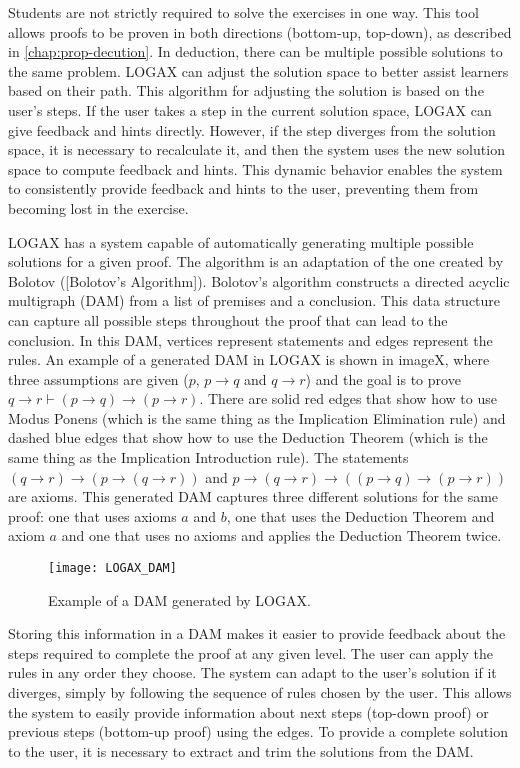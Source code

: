 Students are not strictly required to solve the exercises in one way. This tool allows proofs to be proven in both directions (bottom-up, top-down), as described in \ref{chap:prop-decution}. In deduction, there can be multiple possible solutions to the same problem. LOGAX can adjust the solution space to better assist learners based on their path. This algorithm for adjusting the solution is based on the user's steps. If the user takes a step in the current solution space, LOGAX can give feedback and hints directly. However, if the step diverges from the solution space, it is necessary to recalculate it, and then the system uses the new solution space to compute feedback and hints. This dynamic behavior enables the system to consistently provide feedback and hints to the user, preventing them from becoming lost in the exercise.

LOGAX has a system capable of automatically generating multiple possible solutions for a given proof. The algorithm is an adaptation of the one created by Bolotov ([Bolotov's Algorithm]). Bolotov's algorithm constructs a directed acyclic multigraph (\gls{DAM}) from a list of premises and a conclusion. This data structure can capture all possible steps throughout the proof that can lead to the conclusion. In this \gls{DAM}, vertices represent statements and edges represent the rules. An example of a generated \gls{DAM} in LOGAX is shown in imageX, where three assumptions are given (\(p\), \(p \to q\) and \(q \to r\)) and the goal is to prove \( q \to r \vdash (p \to q) \to (p \to r) \). There are solid red edges that show how to use Modus Ponens (which is the same thing as the Implication Elimination rule) and dashed blue edges that show how to use the Deduction Theorem (which is the same thing as the Implication Introduction rule). The statements \((q \to r) \to (p \to (q \to r)) \) and \( p \to (q \to r) \to ((p \to q) \to (p \to r)) \) are axioms. This generated \gls{DAM} captures three different solutions for the same proof: one that uses axioms \(a\) and \(b\), one that uses the Deduction Theorem and axiom \(a\) and one that uses no axioms and applies the Deduction Theorem twice.

\begin{figure}[htbp]
    \centering
    \texttt{[image: LOGAX\_DAM]}
    \caption{Example of a \gls{DAM} generated by LOGAX.}
\end{figure}

Storing this information in a \gls{DAM} makes it easier to provide feedback about the steps required to complete the proof at any given level. The user can apply the rules in any order they choose. The system can adapt to the user's solution if it diverges, simply by following the sequence of rules chosen by the user. This allows the system to easily provide information about next steps (top-down proof) or previous steps (bottom-up proof) using the edges. To provide a complete solution to the user, it is necessary to extract and trim the solutions from the \gls{DAM}.

